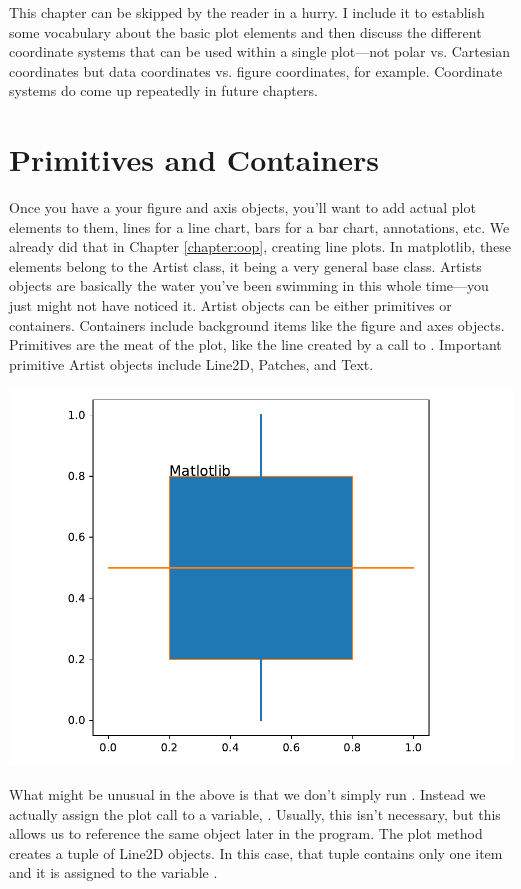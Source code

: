 
This chapter can be skipped by the reader in a hurry. I include it to establish some vocabulary about the basic plot elements and then discuss the different coordinate systems that can be used within a single plot---not polar vs. Cartesian coordinates but data coordinates vs. figure coordinates, for example. Coordinate systems do come up repeatedly in future chapters.


\section{Primitives and Containers}

Once you have a your figure and axis objects, you'll want to add actual plot elements to them, lines for a line chart, bars for a bar chart, annotations, etc. We already did that in Chapter \ref{chapter:oop}, creating line plots. In matplotlib, these elements belong to the Artist class, it being a very general base class. Artists objects are basically the water you've been swimming in this whole time---you just might not have noticed it. Artist objects can be either primitives or containers. Containers include background items like the figure and axes objects. Primitives are the meat of the plot, like the line created by a call to . Important primitive Artist objects include Line2D, Patches, and Text. 


\begin{center}
    \includegraphics[width = .7\textwidth]{figures/proseplots/artists.pdf}
\end{center}


What might be unusual in the above is that we don't simply run . Instead we actually assign the plot call to a variable, . Usually, this isn't necessary, but this allows us to reference the same object later in the program. The plot method creates a tuple of Line2D objects. In this case, that tuple contains only one item and it is assigned to the variable . 


